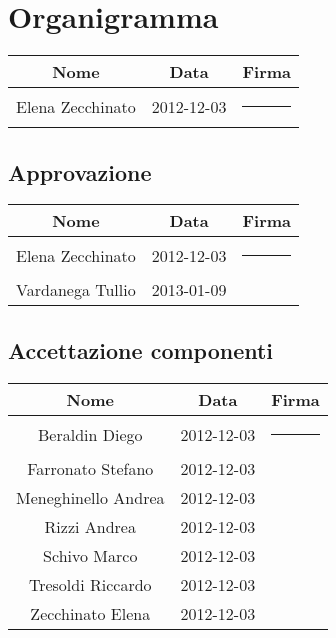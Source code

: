 \section{Organigramma}
\begin{center}
\begin{tabularx}{0.8\textwidth}{c|c|c}
{\bf Nome}&{\bf Data}&{\bf Firma}\\ 
\hline
Elena Zecchinato & 2012-12-03 &\rule{3cm}{0cm} \\
\end{tabularx}
\end{center}

\subsection{Approvazione}
\begin{center}
\begin{tabularx}{0.8\textwidth}{c|c|c}
{\bf Nome}&{\bf Data}&{\bf Firma}\\ 
\hline
Elena Zecchinato & 2012-12-03 &\rule{3cm}{0cm} \\
Vardanega Tullio & 2013-01-09 & \\
\end{tabularx}
\end{center}

\subsection{Accettazione componenti}
\begin{center}
\begin{tabularx}{0.9\textwidth}{c|c|c}
{\bf Nome}&{\bf Data}&{\bf Firma }\\ 
\hline
Beraldin Diego & 2012-12-03&\rule{3cm}{0cm}\\
Farronato Stefano & 2012-12-03&\\
Meneghinello Andrea & 2012-12-03&\\
Rizzi Andrea & 2012-12-03&\\
Schivo Marco & 2012-12-03&\\
Tresoldi Riccardo & 2012-12-03&\\
Zecchinato Elena & 2012-12-03&\\
\end{tabularx}
\end{center}


